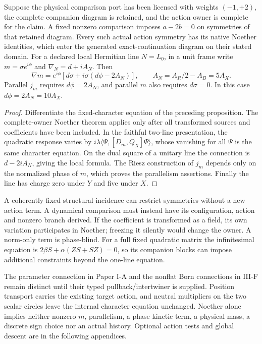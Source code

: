 \documentclass[12pt,a4paper]{article}
\begin{document}
\begin{proposition}
\label{p5:prop:retained-comparison-action-handoff}
Suppose the physical comparison port has been licensed with
weights \((-1,+2)\), the complete companion diagram is
retained, and the action owner is complete for the claim.
A fixed nonzero comparison imposes \(a-2b=0\) on symmetries
of that retained diagram.  Every such actual action symmetry
has its native Noether identities, which enter the generated
exact-continuation diagram on their stated domain.
For a declared local Hermitian line \(N=L_0\), in a unit frame
write \(m=\sigma e^{i\phi}\) and \(\nabla_N=d+iA_N\).  Then
\[
 \nabla m=e^{i\phi}
       [d\sigma+i\sigma(d\phi-2A_N)],\qquad
 A_N=A_R/2-A_B=5A_X.
\]
Parallel \(j_m\) requires \(d\phi=2A_N\), and parallel \(m\)
also requires \(d\sigma=0\).  In this case
\(d\phi=2A_N=10A_X\).
\end{proposition}
\begin{proof}
Differentiate the fixed-character equation of the preceding
proposition.  The complete-owner Noether theorem applies only
after all transformed sources and coefficients have been
included.  In the faithful two-line presentation, the
quadratic response varies by
\(i\lambda\langle\Psi,[D_m,Q_X]\Psi\rangle\), whose vanishing
for all \(\Psi\) is the same character equation.
On the dual square of a unitary line the connection is
\(d-2iA_N\), giving the local formula.  The Riesz construction
of \(j_m\) depends only on the normalized phase of \(m\),
which proves the parallelism assertions.  Finally the line
has charge zero under \(Y\) and five under \(X\).
\end{proof}

A coherently fixed structural incidence can restrict symmetries
without a new action term.  A dynamical comparison must instead
have its configuration, action and nonzero branch derived.
If the coefficient is transformed as a field, its own
variation participates in Noether; freezing it silently would
change the owner.  A norm-only term is phase-blind.
For a full fixed quadratic matrix the infinitesimal equation is
\(2\beta S+\alpha(ZS+SZ)=0\), so its companion blocks can impose
additional constraints beyond the one-line equation.

The parameter connection in Paper I-A and the nonflat Born
connections in III-F remain distinct until their typed
pullback/intertwiner is supplied.  Position transport carries
the existing target action, and neutral multipliers on the
two scalar circles leave the internal character equation
unchanged.  Noether alone implies neither nonzero \(m\),
parallelism, a phase kinetic term, a physical mass, a discrete
sign choice nor an actual history.  Optional action tests and
global descent are in the following appendices.
\end{document}

